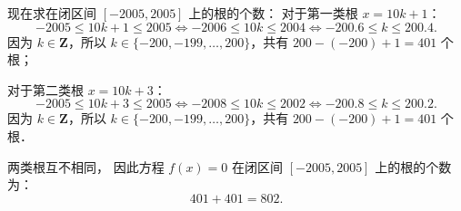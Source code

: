 \begin{answer}
现在求在闭区间 $[-2005, 2005]$ 上的根的个数：
对于第一类根 $x = 10k + 1$：
\nopagebreak[4]
\[
-2005 \leqslant 10k + 1 \leqslant 2005 \iff -2006 \leqslant 10k \leqslant 2004 \iff -200.6 \leqslant k \leqslant 200.4.
\]
因为 $k \in \mathbf{Z}$，所以 $k \in \{-200, -199, \dots, 200\}$，共有 $200 - (-200) + 1 = 401$ 个根；

对于第二类根 $x = 10k + 3$：
\nopagebreak[4]
\[
-2005 \leqslant 10k + 3 \leqslant 2005 \iff -2008 \leqslant 10k \leqslant 2002 \iff -200.8 \leqslant k \leqslant 200.2.
\]
因为 $k \in \mathbf{Z}$，所以 $k \in \{-200, -199, \dots, 200\}$，共有 $200 - (-200) + 1 = 401$ 个根．

两类根互不相同，
因此方程 $f(x) = 0$ 在闭区间 $[-2005, 2005]$ 上的根的个数为：
\nopagebreak[4]
\[
401 + 401 = 802.
\]



\end{answer}

